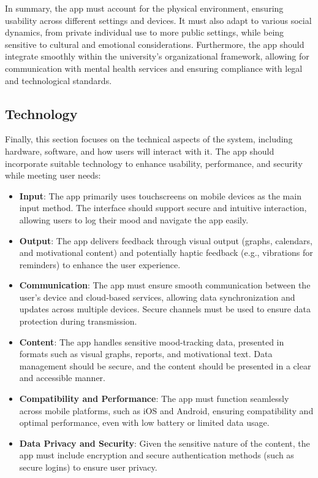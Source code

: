 \vspace{5mm}

\noindent In summary, the app must account for the physical environment, ensuring usability across different settings and devices. It must also adapt to various social dynamics, from private individual use to more public settings, while being sensitive to cultural and emotional considerations. Furthermore, the app should integrate smoothly within the university's organizational framework, allowing for communication with mental health services and ensuring compliance with legal and technological standards.

\subsection{Technology}

Finally, this section focuses on the technical aspects of the system, including hardware, software, and how users will interact with it. The app should incorporate suitable technology to enhance usability, performance, and security while meeting user needs:

\begin{itemize}
    \item \textbf{Input}: The app primarily uses touchscreens on mobile devices as the main input method. The interface should support secure and intuitive interaction, allowing users to log their mood and navigate the app easily.
    \item \textbf{Output}: The app delivers feedback through visual output (graphs, calendars, and motivational content) and potentially haptic feedback (e.g., vibrations for reminders) to enhance the user experience.
    \item \textbf{Communication}: The app must ensure smooth communication between the user’s device and cloud-based services, allowing data synchronization and updates across multiple devices. Secure channels must be used to ensure data protection during transmission.
    \item \textbf{Content}: The app handles sensitive mood-tracking data, presented in formats such as visual graphs, reports, and motivational text. Data management should be secure, and the content should be presented in a clear and accessible manner.
    \item \textbf{Compatibility and Performance}: The app must function seamlessly across mobile platforms, such as iOS and Android, ensuring compatibility and optimal performance, even with low battery or limited data usage.
    \item \textbf{Data Privacy and Security}: Given the sensitive nature of the content, the app must include encryption and secure authentication methods (such as secure logins) to ensure user privacy.
\end{itemize}

